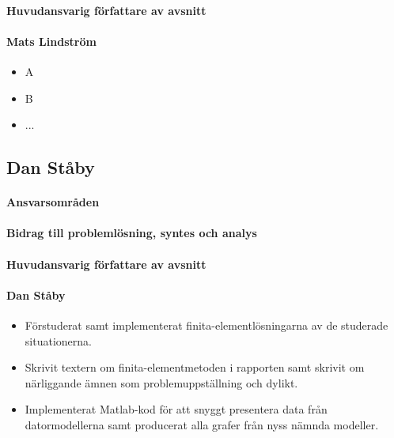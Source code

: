 \documentclass[12pt,a4paper]{article}
\begin{document}
\paragraph{Huvudansvarig författare av avsnitt}


\paragraph{Mats Lindström}
\begin{itemize}
\item A
\item B
\item ...
\end{itemize}



\subsection*{Dan Ståby}

\paragraph{Ansvarsområden}

\paragraph{Bidrag till problemlösning, syntes och analys}

\paragraph{Huvudansvarig författare av avsnitt}

\paragraph{Dan Ståby}
\begin{itemize}
\item Förstuderat samt implementerat finita-elementlösningarna av de studerade situationerna.
\item Skrivit textern om finita-elementmetoden i rapporten samt skrivit om närliggande ämnen som problemuppställning och dylikt. 
\item Implementerat Matlab-kod för att snyggt presentera data från datormodellerna samt producerat alla grafer från
nyss nämnda modeller.
\end{itemize}
\end{document}
